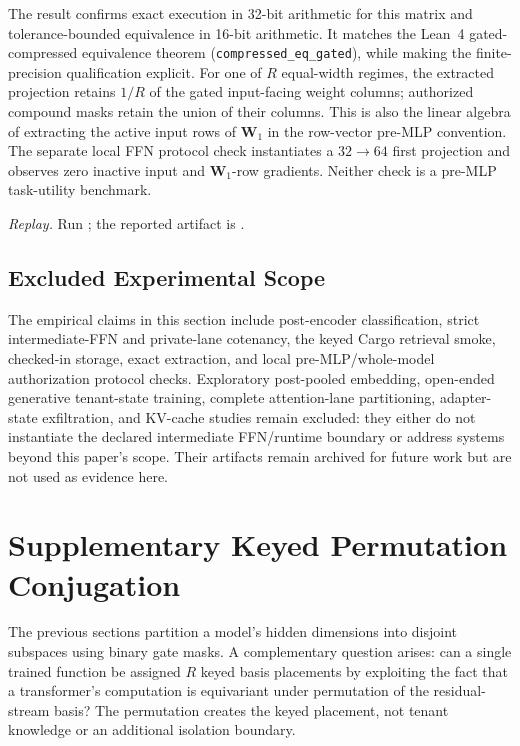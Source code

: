 \documentclass[11pt,a4paper]{article}
\newcommand{\bW}{\mathbf{W}}
\begin{document}
The result confirms exact execution in 32-bit arithmetic for this
matrix and tolerance-bounded equivalence in 16-bit arithmetic.  It
matches the Lean~4 gated-compressed equivalence theorem
(\texttt{compressed\_eq\_gated}), while making the finite-precision
qualification explicit.  For one of $R$ equal-width regimes, the
extracted projection retains $1/R$ of the gated input-facing weight
columns; authorized compound masks retain the union of their columns.
This is also the linear algebra of extracting the active input rows of
$\bW_1$ in the row-vector pre-MLP convention.  The separate local FFN
protocol check instantiates a $32\mathbin{\to}64$ first projection and
observes zero inactive input and $\bW_1$-row gradients.  Neither check
is a pre-MLP task-utility benchmark.

\begin{sloppypar}
\noindent\textit{Replay.} Run
; the reported artifact is
.
\end{sloppypar}

\subsection{Excluded Experimental Scope}
\label{sec:excluded-experiments}

The empirical claims in this section include post-encoder
classification, strict intermediate-FFN and private-lane cotenancy,
the keyed Cargo retrieval smoke, checked-in storage, exact extraction,
and local pre-MLP/whole-model authorization protocol checks.
Exploratory post-pooled embedding, open-ended generative
tenant-state training, complete attention-lane partitioning,
adapter-state exfiltration, and KV-cache studies remain excluded:
they either do not instantiate the declared intermediate FFN/runtime
boundary or address systems beyond this paper's scope.  Their
artifacts remain archived for future work but are not used as
evidence here.

\section{Supplementary Keyed Permutation Conjugation}
\label{sec:orthogonal-superposition}

The previous sections partition a model's hidden dimensions into
disjoint subspaces using binary gate masks.  A complementary
question arises: can a single trained function be assigned $R$
keyed basis placements
by exploiting the fact that a transformer's computation is
equivariant under permutation of the residual-stream basis?  The
permutation creates the keyed placement, not tenant knowledge or an
additional isolation boundary.
\end{document}

